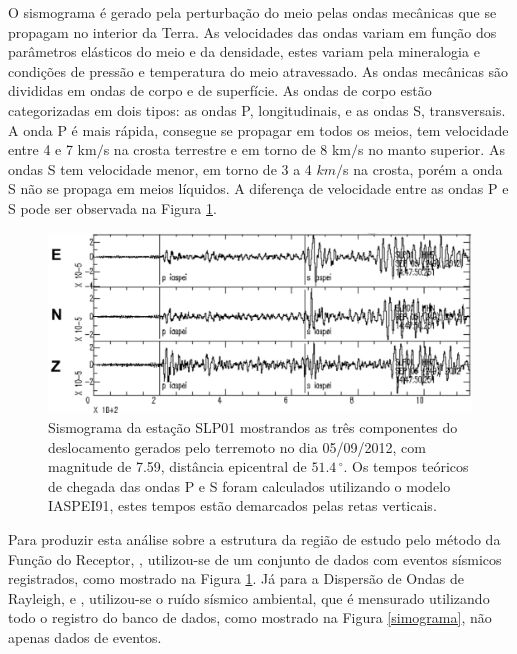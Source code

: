 O sismograma é gerado pela perturbação do meio pelas ondas  mecânicas que se propagam no interior da Terra. As velocidades das ondas variam em função dos parâmetros elásticos do meio e da densidade, estes variam pela mineralogia e condições de pressão e temperatura do meio atravessado. As ondas mecânicas são divididas em ondas de corpo e de superfície. As ondas de corpo estão categorizadas em dois tipos: as ondas P, longitudinais, e as ondas S, transversais. A onda P é mais rápida, consegue se propagar em todos os meios, tem velocidade entre 4 e 7 km$/$s na crosta terrestre e em torno de 8 km$/$s no manto superior. As ondas S tem velocidade menor, em torno de 3 a 4 $km/$s na crosta, porém a onda S não se propaga em meios líquidos. A diferença de velocidade entre as ondas P e S pode ser observada na Figura \ref{simograma_componentes}.

\begin{figure}[!ht]
\centering
\includegraphics[scale=0.6]{Figs/sismograma.png}
\caption[Sismograma da estação SLP01 mostrandos as três componentes do deslocamento gerados pelo terremoto no dia 05/09/2012.]{Sismograma da estação SLP01 mostrandos as três componentes do deslocamento gerados pelo terremoto no dia 05/09/2012, com magnitude de 7.59, distância epicentral de $51.4\,^{\circ}$. Os tempos teóricos de chegada das ondas P e S foram calculados utilizando o modelo IASPEI91, estes tempos estão demarcados pelas retas verticais.}
\label{simograma_componentes}
\end{figure}

Para produzir esta análise sobre a estrutura da região de estudo pelo método da Função do Receptor, \cite{langston_structure_1979}, utilizou-se de um conjunto de dados com eventos sísmicos registrados, como mostrado na Figura \ref{simograma_componentes}. Já para a Dispersão de Ondas de Rayleigh, \cite{campillo_long-range_2003} e \cite{shapiro_emergence_2004}, utilizou-se o ruído sísmico ambiental, que é mensurado utilizando todo o registro do banco de dados, como mostrado na Figura \ref{simograma}, não apenas dados de eventos.

